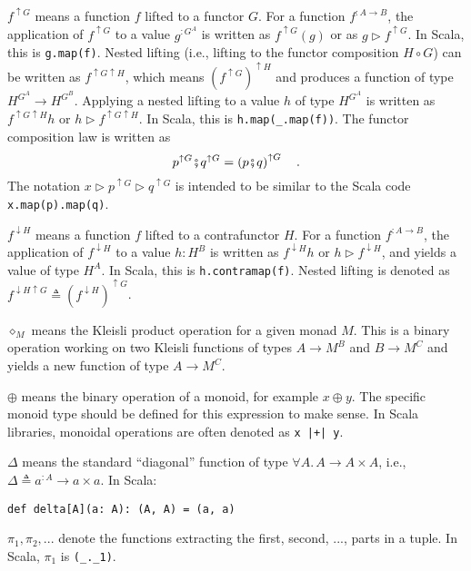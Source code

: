 $f^{\uparrow G}$ means a function $f$ lifted to a functor $G$.
For a function $f^{:A\rightarrow B}$, the application of $f^{\uparrow G}$
to a value $g^{:G^{A}}$ is written as $f^{\uparrow G}(g)$ or as
$g\triangleright f^{\uparrow G}$. In Scala, this is \lstinline!g.map(f)!.
Nested lifting (i.e., lifting to the functor composition $H\circ G$)
can be written as $f^{\uparrow G\uparrow H}$, which means $\left(f^{\uparrow G}\right)^{\uparrow H}$
and produces a function of type $H^{G^{A}}\rightarrow H^{G^{B}}$.
Applying a nested lifting to a value $h$ of type $H^{G^{A}}$ is
written as $f^{\uparrow G\uparrow H}h$ or $h\triangleright f^{\uparrow G\uparrow H}$.
In Scala, this is \lstinline!h.map(_.map(f))!. The functor composition
law is written as
\[
p^{\uparrow G}\bef q^{\uparrow G}=\left(p\bef q\right)^{\uparrow G}\quad.
\]
The notation $x\triangleright p^{\uparrow G}\triangleright q^{\uparrow G}$
is intended to be similar to the Scala code \lstinline!x.map(p).map(q)!.

$f^{\downarrow H}$ means a function $f$ lifted to a contrafunctor
$H$. For a function $f^{:A\rightarrow B}$, the application of $f^{\downarrow H}$
to a value $h:H^{B}$ is written as $f^{\downarrow H}h$ or $h\triangleright f^{\downarrow H}$,
and yields a value of type $H^{A}$. In Scala, this is \lstinline!h.contramap(f)!.
Nested lifting is denoted as $f^{\downarrow H\uparrow G}\triangleq(f^{\downarrow H})^{\uparrow G}$.

$\diamond_{M}$ means the Kleisli product operation for a given monad
$M$. This is a binary operation working on two Kleisli functions
of types $A\rightarrow M^{B}$ and $B\rightarrow M^{C}$ and yields
a new function of type $A\rightarrow M^{C}$.

$\oplus$ means the binary operation of a monoid, for example $x\oplus y$.
The specific monoid type should be defined for this expression to
make sense. In Scala libraries, monoidal operations are often denoted
as \lstinline!x |+| y!.

$\Delta$ means the standard \textsf{``}diagonal\textsf{''} function of type $\forall A.\,A\rightarrow A\times A$,
i.e., $\Delta\triangleq a^{:A}\rightarrow a\times a$. In Scala:
\begin{lstlisting}
def delta[A](a: A): (A, A) = (a, a)
\end{lstlisting}

$\pi_{1},\pi_{2},...$ denote the functions extracting the first,
second, ..., parts in a tuple. In Scala, $\pi_{1}$ is \lstinline!(_._1)!.

